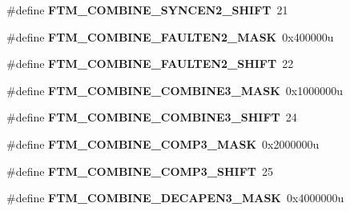 \begin{DoxyCompactItemize}
\item 
\hypertarget{group___f_t_m___register___masks_ga64914009d95ebee18e191655129c2c07}{}\#define {\bfseries F\+T\+M\+\_\+\+C\+O\+M\+B\+I\+N\+E\+\_\+\+S\+Y\+N\+C\+E\+N2\+\_\+\+S\+H\+I\+F\+T}~21\label{group___f_t_m___register___masks_ga64914009d95ebee18e191655129c2c07}

\item 
\hypertarget{group___f_t_m___register___masks_gad67706e653caa0da6a85514ebd5d2fc7}{}\#define {\bfseries F\+T\+M\+\_\+\+C\+O\+M\+B\+I\+N\+E\+\_\+\+F\+A\+U\+L\+T\+E\+N2\+\_\+\+M\+A\+S\+K}~0x400000u\label{group___f_t_m___register___masks_gad67706e653caa0da6a85514ebd5d2fc7}

\item 
\hypertarget{group___f_t_m___register___masks_ga35ee8ad9a6f4e07fa058735b7807e0a8}{}\#define {\bfseries F\+T\+M\+\_\+\+C\+O\+M\+B\+I\+N\+E\+\_\+\+F\+A\+U\+L\+T\+E\+N2\+\_\+\+S\+H\+I\+F\+T}~22\label{group___f_t_m___register___masks_ga35ee8ad9a6f4e07fa058735b7807e0a8}

\item 
\hypertarget{group___f_t_m___register___masks_gac97253f34364aee2a49e2ad8c470f46c}{}\#define {\bfseries F\+T\+M\+\_\+\+C\+O\+M\+B\+I\+N\+E\+\_\+\+C\+O\+M\+B\+I\+N\+E3\+\_\+\+M\+A\+S\+K}~0x1000000u\label{group___f_t_m___register___masks_gac97253f34364aee2a49e2ad8c470f46c}

\item 
\hypertarget{group___f_t_m___register___masks_gac4d1e467f5f7a75c3c0f9f84819580e2}{}\#define {\bfseries F\+T\+M\+\_\+\+C\+O\+M\+B\+I\+N\+E\+\_\+\+C\+O\+M\+B\+I\+N\+E3\+\_\+\+S\+H\+I\+F\+T}~24\label{group___f_t_m___register___masks_gac4d1e467f5f7a75c3c0f9f84819580e2}

\item 
\hypertarget{group___f_t_m___register___masks_gac7ae22ebae3b9dafb28376801cac4f9d}{}\#define {\bfseries F\+T\+M\+\_\+\+C\+O\+M\+B\+I\+N\+E\+\_\+\+C\+O\+M\+P3\+\_\+\+M\+A\+S\+K}~0x2000000u\label{group___f_t_m___register___masks_gac7ae22ebae3b9dafb28376801cac4f9d}

\item 
\hypertarget{group___f_t_m___register___masks_ga7ed13b0798dd080009e0e0843bab210f}{}\#define {\bfseries F\+T\+M\+\_\+\+C\+O\+M\+B\+I\+N\+E\+\_\+\+C\+O\+M\+P3\+\_\+\+S\+H\+I\+F\+T}~25\label{group___f_t_m___register___masks_ga7ed13b0798dd080009e0e0843bab210f}

\item 
\hypertarget{group___f_t_m___register___masks_ga86ff21306cbdb626b711080b76d0366e}{}\#define {\bfseries F\+T\+M\+\_\+\+C\+O\+M\+B\+I\+N\+E\+\_\+\+D\+E\+C\+A\+P\+E\+N3\+\_\+\+M\+A\+S\+K}~0x4000000u\label{group___f_t_m___register___masks_ga86ff21306cbdb626b711080b76d0366e}


\end{DoxyCompactItemize}
